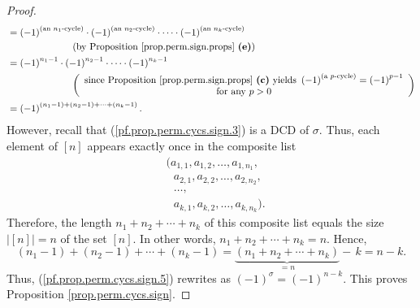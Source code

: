 \begin{proof}
\begin{align}
&  =\left(  -1\right)  ^{\left(  \text{an }n_{1}\text{-cycle}\right)  }%
\cdot\left(  -1\right)  ^{\left(  \text{an }n_{2}\text{-cycle}\right)  }%
\cdot\cdots\cdot\left(  -1\right)  ^{\left(  \text{an }n_{k}\text{-cycle}%
\right)  }\nonumber\\
&  \ \ \ \ \ \ \ \ \ \ \ \ \ \ \ \ \ \ \ \ \left(  \text{by Proposition
\ref{prop.perm.sign.props} \textbf{(e)}}\right) \nonumber\\
&  =\left(  -1\right)  ^{n_{1}-1}\cdot\left(  -1\right)  ^{n_{2}-1}\cdot
\cdots\cdot\left(  -1\right)  ^{n_{k}-1}\nonumber\\
&  \ \ \ \ \ \ \ \ \ \ \ \ \ \ \ \ \ \ \ \ \left(
\begin{array}
[c]{c}%
\text{since Proposition \ref{prop.perm.sign.props} \textbf{(c)} yields
}\left(  -1\right)  ^{\left(  \text{a }p\text{-cycle}\right)  }=\left(
-1\right)  ^{p-1}\\
\text{for any }p>0
\end{array}
\right) \nonumber\\
&  =\left(  -1\right)  ^{\left(  n_{1}-1\right)  +\left(  n_{2}-1\right)
+\cdots+\left(  n_{k}-1\right)  }. \label{pf.prop.perm.cycs.sign.5}%
\end{align}
However, recall that (\ref{pf.prop.perm.cycs.sign.3}) is a DCD of $\sigma$.
Thus, each element of $\left[  n\right]  $ appears exactly once in the
composite list%
\begin{align*}
&  (a_{1,1},a_{1,2},\ldots,a_{1,n_{1}},\\
&  \ \ \ a_{2,1},a_{2,2},\ldots,a_{2,n_{2}},\\
&  \ \ \ \ldots,\\
&  \ \ \ a_{k,1},a_{k,2},\ldots,a_{k,n_{k}}).
\end{align*}
Therefore, the length $n_{1}+n_{2}+\cdots+n_{k}$ of this composite list equals
the size $\left\vert \left[  n\right]  \right\vert =n$ of the set $\left[
n\right]  $. In other words, $n_{1}+n_{2}+\cdots+n_{k}=n$. Hence,%
\[
\left(  n_{1}-1\right)  +\left(  n_{2}-1\right)  +\cdots+\left(
n_{k}-1\right)  =\underbrace{\left(  n_{1}+n_{2}+\cdots+n_{k}\right)  }%
_{=n}-\,k=n-k.
\]
Thus, (\ref{pf.prop.perm.cycs.sign.5}) rewrites as $\left(  -1\right)
^{\sigma}=\left(  -1\right)  ^{n-k}$. This proves Proposition
\ref{prop.perm.cycs.sign}.
\end{proof}
